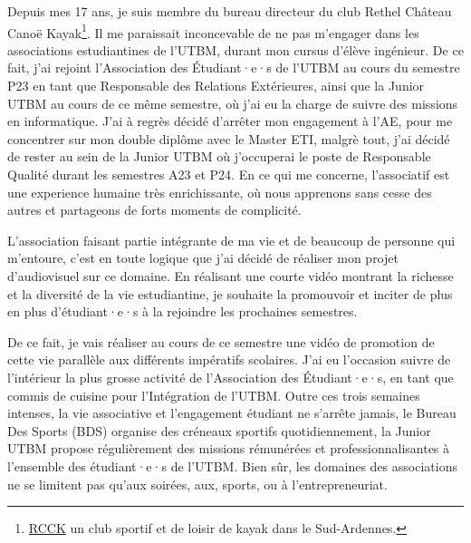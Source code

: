 
Depuis mes 17 ans, je suis membre du bureau directeur du club Rethel Château Canoë Kayak\footnote{\href{https://rcck-ardennes.fr}{RCCK} un club sportif et de loisir de kayak dans le Sud-Ardennes.}.
Il me paraissait inconcevable de ne pas m'engager dans les associations estudiantines de l'UTBM, durant mon cursus d'élève ingénieur.
De ce fait, j'ai rejoint l'Association des Étudiant·e·s de l'UTBM au cours du semestre P23 en tant que Responsable des Relations Extérieures, ainsi que la Junior UTBM au cours de ce même semestre, où j'ai eu la charge de suivre des missions en informatique.
J'ai à regrès décidé d'arrêter mon engagement à l'AE, pour me concentrer sur mon double diplôme avec le Master ETI, malgrè tout, j'ai décidé de rester au sein de la Junior UTBM où j'occuperai le poste de Responsable Qualité durant les semestres A23 et P24.
En ce qui me concerne, l'associatif est une experience humaine très enrichissante, où nous apprenons sans cesse des autres et partageons de forts moments de complicité.

L'association faisant partie intégrante de ma vie et de beaucoup de personne qui m'entoure, c'est en toute logique que j'ai décidé de réaliser mon projet d'audiovisuel sur ce domaine.
En réalisant une courte vidéo montrant la richesse et la diversité de la vie estudiantine, je souhaite la promouvoir et inciter de plus en plus d'étudiant·e·s à la rejoindre les prochaines semestres.

De ce fait, je vais réaliser au cours de ce semestre une vidéo de promotion de cette vie parallèle aux différents impératifs scolaires.
J'ai eu l'occasion suivre de l'intérieur la plus grosse activité de l'Association des Étudiant·e·s, en tant que commis de cuisine pour l'Intégration de l'UTBM.
Outre ces trois semaines intenses, la vie associative et l'engagement étudiant ne s'arrête jamais, le Bureau Des Sports (BDS) organise des créneaux sportifs quotidiennement, la Junior UTBM propose régulièrement des missions rémunérées et professionnalisantes à l'ensemble des étudiant·e·s de l'UTBM.
Bien sûr, les domaines des associations ne se limitent pas qu'aux soirées, aux, sports, ou à l'entrepreneuriat.